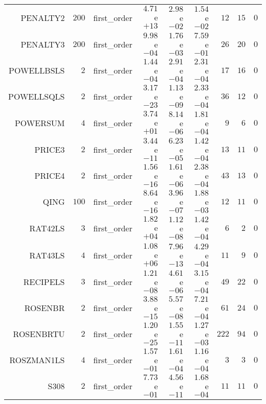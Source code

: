 \begin{longtable}{rrrrrrrrr}
PENALTY2 & \(   200\) & first\_order & \( 4.71\)e\(+13\) & \( 2.98\)e\(-02\) & \( 1.54\)e\(-02\) & \(    12\) & \(    15\) & \(     0\) \\
PENALTY3 & \(   200\) & first\_order & \( 9.98\)e\(-04\) & \( 1.76\)e\(-03\) & \( 7.59\)e\(-01\) & \(    26\) & \(    20\) & \(     0\) \\
POWELLBSLS & \(     2\) & first\_order & \( 1.44\)e\(-04\) & \( 2.91\)e\(-04\) & \( 2.31\)e\(-04\) & \(    17\) & \(    16\) & \(     0\) \\
POWELLSQLS & \(     2\) & first\_order & \( 3.17\)e\(-23\) & \( 1.13\)e\(-09\) & \( 2.33\)e\(-04\) & \(    36\) & \(    12\) & \(     0\) \\
POWERSUM & \(     4\) & first\_order & \( 3.74\)e\(+01\) & \( 8.14\)e\(-06\) & \( 1.81\)e\(-04\) & \(     9\) & \(     6\) & \(     0\) \\
PRICE3 & \(     2\) & first\_order & \( 3.44\)e\(-11\) & \( 6.23\)e\(-05\) & \( 1.42\)e\(-04\) & \(    13\) & \(    11\) & \(     0\) \\
PRICE4 & \(     2\) & first\_order & \( 1.56\)e\(-16\) & \( 1.61\)e\(-06\) & \( 2.38\)e\(-04\) & \(    43\) & \(    13\) & \(     0\) \\
QING & \(   100\) & first\_order & \( 8.64\)e\(-16\) & \( 3.96\)e\(-07\) & \( 1.88\)e\(-03\) & \(    12\) & \(    11\) & \(     0\) \\
RAT42LS & \(     3\) & first\_order & \( 1.82\)e\(+04\) & \( 1.12\)e\(-08\) & \( 1.42\)e\(-04\) & \(     6\) & \(     2\) & \(     0\) \\
RAT43LS & \(     4\) & first\_order & \( 1.08\)e\(+06\) & \( 7.96\)e\(-13\) & \( 4.29\)e\(-04\) & \(    11\) & \(     9\) & \(     0\) \\
RECIPELS & \(     3\) & first\_order & \( 1.21\)e\(-08\) & \( 4.61\)e\(-06\) & \( 3.15\)e\(-04\) & \(    49\) & \(    22\) & \(     0\) \\
ROSENBR & \(     2\) & first\_order & \( 3.88\)e\(-15\) & \( 5.57\)e\(-08\) & \( 7.21\)e\(-04\) & \(    61\) & \(    24\) & \(     0\) \\
ROSENBRTU & \(     2\) & first\_order & \( 1.20\)e\(-25\) & \( 1.55\)e\(-11\) & \( 1.27\)e\(-03\) & \(   222\) & \(    94\) & \(     0\) \\
ROSZMAN1LS & \(     4\) & first\_order & \( 1.57\)e\(-01\) & \( 1.61\)e\(-04\) & \( 1.16\)e\(-04\) & \(     3\) & \(     3\) & \(     0\) \\
S308 & \(     2\) & first\_order & \( 7.73\)e\(-01\) & \( 4.56\)e\(-11\) & \( 1.68\)e\(-04\) & \(    11\) & \(    11\) & \(     0\) \\

\end{longtable}
